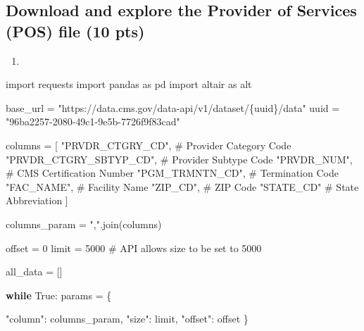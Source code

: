 \documentclass[
  letterpaper,
  DIV=11,
  numbers=noendperiod]{scrartcl}
\newenvironment{Shaded}{\begin{snugshade}}{\end{snugshade}}
\newcommand{\CommentTok}[1]{\textcolor[rgb]{0.37,0.37,0.37}{#1}}
\newcommand{\ControlFlowTok}[1]{\textcolor[rgb]{0.00,0.23,0.31}{\textbf{#1}}}
\newcommand{\DecValTok}[1]{\textcolor[rgb]{0.68,0.00,0.00}{#1}}
\newcommand{\ImportTok}[1]{\textcolor[rgb]{0.00,0.46,0.62}{#1}}
\newcommand{\NormalTok}[1]{\textcolor[rgb]{0.00,0.23,0.31}{#1}}
\newcommand{\OperatorTok}[1]{\textcolor[rgb]{0.37,0.37,0.37}{#1}}
\newcommand{\SpecialCharTok}[1]{\textcolor[rgb]{0.37,0.37,0.37}{#1}}
\newcommand{\StringTok}[1]{\textcolor[rgb]{0.13,0.47,0.30}{#1}}
\newcommand{\VariableTok}[1]{\textcolor[rgb]{0.07,0.07,0.07}{#1}}
\providecommand{\tightlist}{%
  \setlength{\itemsep}{0pt}\setlength{\parskip}{0pt}}\usepackage{longtable,booktabs,array}
\begin{document}
\subsection{Download and explore the Provider of Services (POS) file (10
pts)}\label{download-and-explore-the-provider-of-services-pos-file-10-pts}

\begin{enumerate}
\def\labelenumi{\arabic{enumi}.}
\tightlist
\item
\end{enumerate}

\begin{Shaded}
\begin{Highlighting}[]
\ImportTok{import}\NormalTok{ requests}
\ImportTok{import}\NormalTok{ pandas }\ImportTok{as}\NormalTok{ pd}
\ImportTok{import}\NormalTok{ altair }\ImportTok{as}\NormalTok{ alt}

\NormalTok{base\_url }\OperatorTok{=} \StringTok{"https://data.cms.gov/data{-}api/v1/dataset/}\SpecialCharTok{\{uuid\}}\StringTok{/data"}
\NormalTok{uuid }\OperatorTok{=} \StringTok{"96ba2257{-}2080{-}49c1{-}9e5b{-}7726f9f83cad"}

\NormalTok{columns }\OperatorTok{=}\NormalTok{ [}
    \StringTok{"PRVDR\_CTGRY\_CD"}\NormalTok{,        }\CommentTok{\# Provider Category Code}
    \StringTok{"PRVDR\_CTGRY\_SBTYP\_CD"}\NormalTok{,  }\CommentTok{\# Provider Subtype Code}
    \StringTok{"PRVDR\_NUM"}\NormalTok{,             }\CommentTok{\# CMS Certification Number}
    \StringTok{"PGM\_TRMNTN\_CD"}\NormalTok{,         }\CommentTok{\# Termination Code}
    \StringTok{"FAC\_NAME"}\NormalTok{,              }\CommentTok{\# Facility Name}
    \StringTok{"ZIP\_CD"}\NormalTok{,                }\CommentTok{\# ZIP Code}
    \StringTok{"STATE\_CD"}               \CommentTok{\# State Abbreviation}
\NormalTok{]}

\NormalTok{columns\_param }\OperatorTok{=} \StringTok{","}\NormalTok{.join(columns)}

\NormalTok{offset }\OperatorTok{=} \DecValTok{0}
\NormalTok{limit }\OperatorTok{=} \DecValTok{5000}  \CommentTok{\#  API allows size to be set to 5000}

\NormalTok{all\_data }\OperatorTok{=}\NormalTok{ []}

\ControlFlowTok{while} \VariableTok{True}\NormalTok{:}
\NormalTok{    params }\OperatorTok{=}\NormalTok{ \{}

        \StringTok{"column"}\NormalTok{: columns\_param,}
        \StringTok{"size"}\NormalTok{: limit,}
        \StringTok{"offset"}\NormalTok{: offset}
\NormalTok{    \}}


\end{Highlighting}
\end{Shaded}
\end{document}
